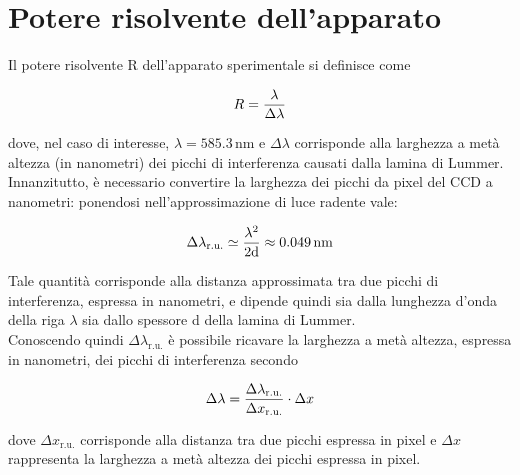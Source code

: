 \documentclass[twocolumn,10pt]{asme2ej}
\begin{document}
\vspace{-10pt}
\section{Potere risolvente dell'apparato}\label{s:risolvente}

Il potere risolvente R dell'apparato sperimentale si definisce come

\vspace{-15pt}
\begin{equation}
    R = \frac{\lambda}{\Delta\lambda}
    \label{e:r}
\vspace{-5pt}
\end{equation}

dove, nel caso di interesse, $\lambda = 585.3 \,\si{\nano\metre}$ e $\Delta\lambda$ corrisponde alla larghezza a metà
altezza (in nanometri) dei picchi di interferenza causati dalla lamina di Lummer. Innanzitutto, è necessario convertire
la larghezza dei picchi da pixel del CCD a nanometri: ponendosi nell'approssimazione di luce radente vale:

\vspace{-10pt}
\begin{equation}
    \Delta\lambda_{\text{r.u.}} \simeq \frac{\lambda^2}{2\text{d}} \approx 0.049\,\si{\nano\metre}
    \label{e:dlambdaru}
\vspace{-5pt}
\end{equation}

Tale quantità corrisponde alla distanza approssimata tra due picchi di interferenza, espressa in nanometri, e dipende
quindi sia dalla lunghezza d'onda della riga $\lambda$ sia dallo spessore d della lamina di Lummer.\\
Conoscendo quindi $\Delta\lambda_{\text{r.u.}}$ è possibile ricavare la larghezza a metà altezza, espressa in nanometri,
dei picchi di interferenza secondo

\vspace{-15pt}
\begin{equation}
    \Delta\lambda = \frac{\Delta\lambda_{\text{r.u.}}}{\Delta x_{\text{r.u.}}} \cdot \Delta x
    \label{e:dlambda}
\vspace{-5pt}
\end{equation}

dove $\Delta x_{\text{r.u.}}$ corrisponde alla distanza tra due picchi espressa in pixel e $\Delta x$ rappresenta la
larghezza a metà altezza dei picchi espressa in pixel.  
\end{document}
